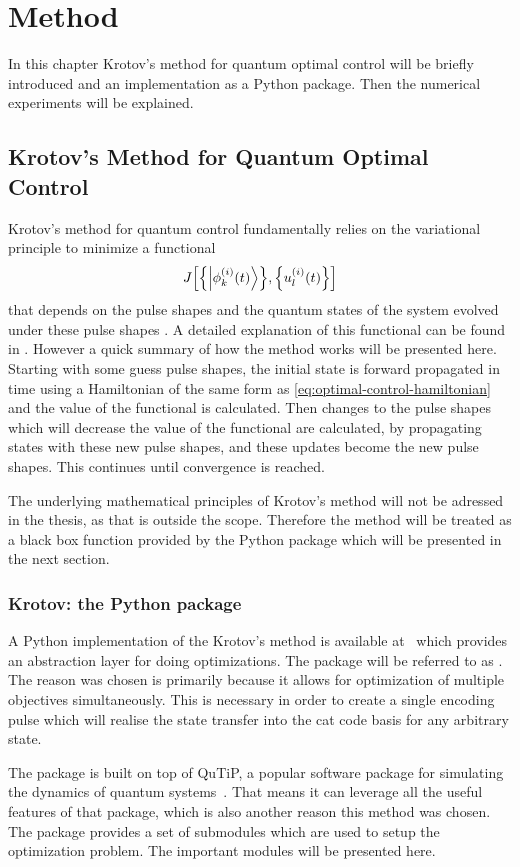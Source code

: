 \documentclass[main.tex]{subfiles}
\begin{document}
\chapter{Method}
In this chapter Krotov's method for quantum optimal control will be briefly introduced and an implementation as a Python package.
Then the numerical experiments will be explained.

\section{Krotov's Method for Quantum Optimal Control}
Krotov's method for quantum control fundamentally relies on the variational principle to minimize a functional
\[ J\qty[\qty{\ket{\phi^{(i)}_k(t)}},\qty{u_l^{(i)}(t)}] \]
that depends on the pulse shapes and the quantum states of the system evolved under these pulse shapes \cite{goerz_krotov:_2019}.
A detailed explanation of this functional can be found in \cite{reich_monotonically_2012}.
However a quick summary of how the method works will be presented here.
Starting with some guess pulse shapes, the initial state is forward propagated in time using a Hamiltonian of the same form as \cref{eq:optimal-control-hamiltonian} and the value of the functional is calculated.
Then changes to the pulse shapes which will decrease the value of the functional are calculated, by propagating states with these new pulse shapes, and these updates become the new pulse shapes.
This continues until convergence is reached.

The underlying mathematical principles of Krotov's method will not be adressed in the thesis, as that is outside the scope.
Therefore the method will be treated as a black box function provided by the Python package which will be presented in the next section.

\subsection{Krotov: the Python package}
A Python implementation of the Krotov's method is available at~\cite{goerz_krotov:_2019} which provides an abstraction layer for doing optimizations.
The package will be referred to as \krotov{}.
The reason \krotov{} was chosen is primarily because it allows for optimization of multiple objectives simultaneously.
This is necessary in order to create a single encoding pulse which will realise the state transfer into the cat code basis for any arbitrary state.

The package is built on top of QuTiP, a popular software package for simulating the dynamics of quantum systems~\cite{johansson_qutip_2013}.
That means it can leverage all the useful features of that package, which is also another reason this method was chosen.
The package provides a set of submodules which are used to setup the optimization problem.
The important modules will be presented here.
\end{document}
